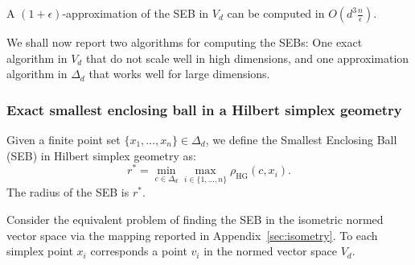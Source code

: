 \documentclass[graybox]{svmult}
\def\st{\ :\ }
\def\HG{\mathrm{HG}}
\begin{document}
\begin{theorem}
A $(1+\epsilon)$-approximation of the SEB in $V_d$ can be computed in $O(d^3\frac{n}{\epsilon})$.
\end{theorem}

We shall now report two algorithms for computing the SEBs: One exact algorithm in $V_d$ that do not scale well in high dimensions,
and one approximation algorithm in $\Delta_d$ that works well for large dimensions.

\subsubsection{Exact smallest enclosing ball in a Hilbert simplex geometry\label{sec:SEBHSG}} 

Given a finite point set $\{x_1,\ldots, x_n\} \in\Delta_d$, we define the Smallest Enclosing Ball (SEB) in Hilbert simplex geometry as:
\begin{equation}
r^*=\min_{c\in \Delta_d} \max_{i\in\{1,\ldots,n\}} \rho_\HG(c,x_i).
\end{equation}
The radius of the SEB is $r^*$.

Consider the equivalent problem of finding the SEB in the isometric normed vector space via the mapping reported in Appendix~\ref{sec:isometry}.
To each simplex point $x_i$ corresponds a point $v_i$ in the normed vector space $V_d$.

%
%
\end{document}
